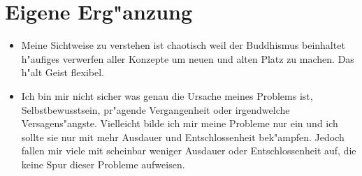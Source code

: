 \documentclass[11pt,a4paper,german]{article}
\begin{document}
\clearpage
\section{Eigene Erg"anzung}
	\begin{itemize}
		\item Meine Sichtweise zu verstehen ist chaotisch weil der Buddhismus beinhaltet h"aufiges verwerfen aller Konzepte um neuen und alten Platz zu machen. Das h"alt Geist flexibel.
		\item Ich bin mir nicht sicher was genau die Ursache meines Problems ist, Selbstbewusstsein, pr"agende Vergangenheit oder irgendwelche Versagens"angste. Vielleicht bilde ich mir meine Probleme nur ein und ich sollte sie nur mit mehr Ausdauer und Entschlossenheit bek"ampfen. Jedoch fallen mir viele mit scheinbar weniger Ausdauer oder Entschlossenheit auf, die keine Spur dieser Probleme aufweisen.
	\end{itemize}
	
\end{document}
